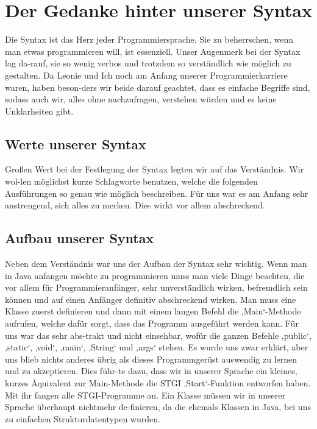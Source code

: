 \documentclass[a4paper, 12pt]{article}
\begin{document}
\section {Der Gedanke hinter unserer Syntax}
Die Syntax ist das Herz jeder Programmiersprache. Sie zu beherrschen, wenn man etwas programmieren will, ist essenziell.  Unser Augenmerk bei der Syntax lag da-rauf, sie so wenig verbos und trotzdem so verständlich wie möglich zu gestalten. Da Leonie und Ich noch am Anfang unserer Programmierkarriere waren, haben beson-ders wir beide darauf geachtet, dass es einfache Begriffe sind, sodass auch wir, alles ohne nachzufragen, verstehen würden und es keine Unklarheiten gibt.

\subsection{Werte unserer Syntax}
Großen Wert bei der Festlegung der Syntax legten wir auf das Verständnis. Wir wol-len möglichst kurze Schlagworte benutzen, welche die folgenden Ausführungen so genau wie möglich beschreiben. Für uns war es am Anfang sehr anstrengend, sich alles zu merken. Dies wirkt vor allem abschreckend.  


\subsection{Aufbau unserer Syntax}
Neben dem Verständnis war uns der Aufbau der Syntax sehr wichtig. Wenn man in Java anfangen möchte zu programmieren muss man viele Dinge beachten, die vor allem für Programmieranfänger, sehr unverständlich wirken, befremdlich sein können und auf einen Anfänger definitiv abschreckend wirken. Man muss eine Klasse zuerst definieren und dann mit einem langen Befehl die ‚Main‘-Methode aufrufen, welche dafür sorgt, dass das Programm ausgeführt werden kann. Für uns war das sehr abs-trakt und nicht einsehbar, wofür die ganzen Befehle ‚public‘, ‚static‘, ‚void‘, ‚main‘, ‚String‘ und ‚args‘ stehen. Es wurde uns zwar erklärt, aber uns blieb nichts anderes übrig als dieses Programmgerüst auswendig zu lernen und zu akzeptieren. Dies führ-te dazu, dass wir in unserer Sprache ein kleines, kurzes Äquivalent zur Main-Methode die STGI ‚Start‘-Funktion entworfen haben. Mit ihr fangen alle STGI-Programme an. Ein Klasse müssen wir in unserer Sprache überhaupt nichtmehr de-finieren, da die ehemals Klassen in Java, bei uns zu einfachen Strukturdatentypen wurden. 
\end{document}

